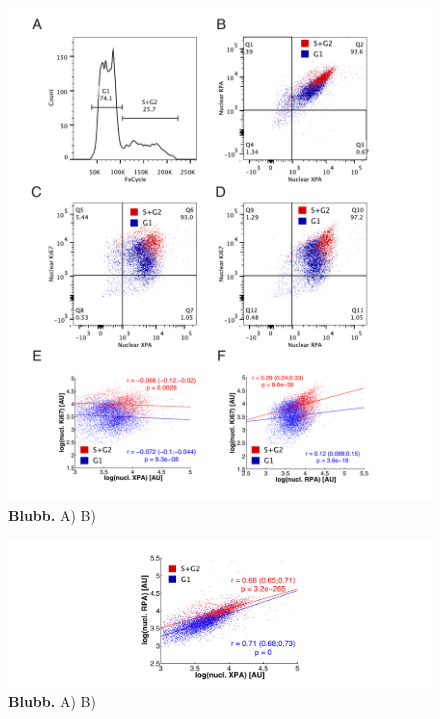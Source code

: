 \begin{figure}[htbp]
	\begin{center}
		\includegraphics[width=1\textwidth]{Abbildungen/figure4_5_2.pdf}
		\caption{\textbf{Blubb.} A) B) }
		\label{fig:FC_cell_cycle}
	\end{center}
\end{figure}



\begin{figure}[htbp]
	\begin{center}
		\includegraphics[width=1\textwidth]{Abbildungen/figure4_7.pdf}
		\caption{\textbf{Blubb.} A) B) }
		\label{fig:FC_cell_cycle_RPAXPA}
	\end{center}
\end{figure}

